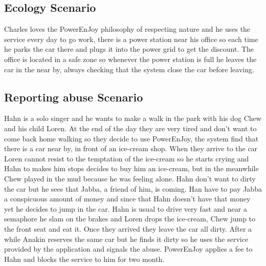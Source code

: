 \subsection{Ecology Scenario}
Charles loves the PowerEnJoy philosophy of respecting nature and he uses the service every day to go work, there is a power station near his office so each time he parks the car there and plugs it into the power grid to get the discount. 
The office is located in a safe zone so whenever the power station is full he leaves the car in the near by, always checking that the system close the car before leaving.

\subsection{Reporting abuse Scenario}
Hahn is a solo singer and he wants to make a walk in the park with his dog Chew and his child Loren. At the end of the day they are very tired and don't want to come back home walking so they decide to use PowerEnJoy, the system find that there is a car near by, in front of an ice-cream shop. When they arrive to the car Loren cannot resist to the temptation of the ice-cream so he starts crying and Hahn to makes him stops decides to buy him an ice-cream, but in the meanwhile Chew played in the mud because he was feeling alone. Hahn don't want to dirty the car but he sees that Jabba, a friend of him, is coming. Han have to pay Jabba a conspicuous amount of money and since that Hahn doesn't have that money yet he decides to jump in the car. Hahn is usual to drive very fast and near a semaphore he slam on the brakes and Loren drops the ice-cream, Chew jump to the front seat and eat it. Once they arrived they leave the car all dirty. After a while Anakin reserves the same car but he finds it dirty so he uses the service provided by the application and signals the abuse. PowerEnJoy applies a fee to Hahn and blocks the service to him for two month.
